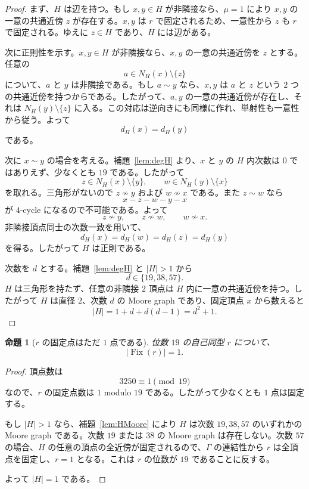 \documentclass[11pt,a4paper]{article}
\theoremstyle{plain}
\newtheorem{proposition}[theorem]{命題}
\theoremstyle{definition}
\theoremstyle{remark}
\DeclareMathOperator{\Fix}{Fix}
\begin{document}
\begin{proof}
まず、$H$ は辺を持つ。もし $x,y \in H$ が非隣接なら、$\mu = 1$ により $x,y$ の一意の共通近傍 $z$ が存在する。$x,y$ は $r$ で固定されるため、一意性から $z$ も $r$ で固定される。ゆえに $z \in H$ であり、$H$ には辺がある。

次に正則性を示す。$x,y \in H$ が非隣接なら、$x,y$ の一意の共通近傍を $z$ とする。任意の
\[
a \in N_H(x) \setminus \{z\}
\]
について、$a$ と $y$ は非隣接である。もし $a \sim y$ なら、$x,y$ は $a$ と $z$ という $2$ つの共通近傍を持つからである。したがって、$a,y$ の一意の共通近傍が存在し、それは $N_H(y) \setminus \{z\}$ に入る。この対応は逆向きにも同様に作れ、単射性も一意性から従う。よって
\[
d_H(x) = d_H(y)
\]
である。

次に $x \sim y$ の場合を考える。補題~\ref{lem:degH} より、$x$ と $y$ の $H$ 内次数は $0$ ではありえず、少なくとも $19$ である。したがって
\[
z \in N_H(x) \setminus \{y\}, \qquad w \in N_H(y) \setminus \{x\}
\]
を取れる。三角形がないので $z \not\sim y$ および $w \not\sim x$ である。また $z \sim w$ なら
\[
x - z - w - y - x
\]
が $4$-cycle になるので不可能である。よって
\[
z \not\sim y, \qquad z \not\sim w, \qquad w \not\sim x.
\]
非隣接頂点同士の次数一致を用いて、
\[
d_H(x) = d_H(w) = d_H(z) = d_H(y)
\]
を得る。したがって $H$ は正則である。

次数を $d$ とする。補題~\ref{lem:degH} と $|H|>1$ から
\[
d \in \{19,38,57\}.
\]
$H$ は三角形を持たず、任意の非隣接 $2$ 頂点は $H$ 内に一意の共通近傍を持つ。したがって $H$ は直径 $2$、次数 $d$ の Moore graph であり、固定頂点 $x$ から数えると
\[
|H| = 1 + d + d(d-1) = d^2 + 1.
\]
\end{proof}

\begin{proposition}[$r$ の固定点はただ $1$ 点である]\label{prop:fix1}
位数 $19$ の自己同型 $r$ について、
\[
|\Fix(r)| = 1.
\]
\end{proposition}

\begin{proof}
頂点数は
\[
3250 \equiv 1 \pmod{19}
\]
なので、$r$ の固定点数は $1$ modulo $19$ である。したがって少なくとも $1$ 点は固定する。

もし $|H|>1$ なら、補題~\ref{lem:HMoore} により $H$ は次数 $19,38,57$ のいずれかの Moore graph である。次数 $19$ または $38$ の Moore graph は存在しない。次数 $57$ の場合、$H$ の任意の頂点の全近傍が固定されるので、$\Gamma$ の連結性から $r$ は全頂点を固定し、$r = 1$ となる。これは $r$ の位数が $19$ であることに反する。

よって $|H| = 1$ である。
\end{proof}
\end{document}
